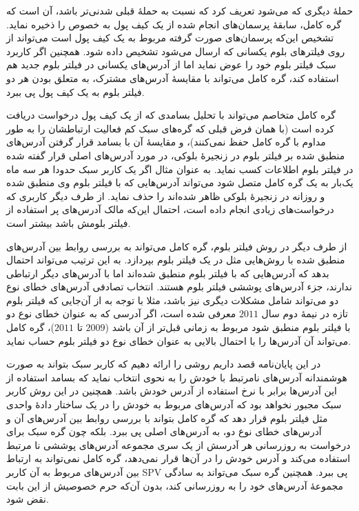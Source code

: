 حملهٔ دیگری که می‌شود تعریف کرد که نسبت به حملهٔ قبلی شدنی‌تر باشد، آن است که گره کامل، سابقهٔ پرسمان‌های انجام شده از یک کیف پول به خصوص را ذخیره نماید. تشخیص این‌که پرسمان‌های صورت گرفته مربوط به یک کیف پول است می‌تواند از روی فیلتر‌های بلوم یکسانی که ارسال می‌شود تشخیص داده شود. همچنین اگر کاربرد سبک فیلتر بلوم خود را عوض نماید اما از آدرس‌های یکسانی در فیلتر بلوم جدید هم استفاده کند،‌ گره کامل می‌تواند با مقایسهٔ آدرس‌های مشترک، به متعلق بودن هر دو فیلتر بلوم به یک کیف پول پی ببرد.

گره کامل متخاصم می‌تواند با تحلیل بسامدی که از یک کیف پول درخواست دریافت کرده است (با همان فرض قبلی که گره‌های سبک کم فعالیت ارتباطشان را به طور مداوم با گره کامل حفظ نمی‌کنند)، و مقایسهٔ آن با بسامد قرار گرفتن آدرس‌های منطبق شده بر فیلتر بلوم در زنجیرهٔ بلوکی، در مورد آدرس‌های اصلی قرار گفته شده در فیلتر بلوم اطلاعات کسب نماید. به عنوان مثال اگر یک کاربر سبک حدودا هر سه ماه یک‌بار به یک گره کامل متصل شود می‌تواند آدرس‌هایی که با فیلتر بلوم وی منطبق شده و روزانه در زنجیرهٔ بلوکی ظاهر شده‌اند را حذف نماید. از طرف دیگر کاربری که درخواست‌های زیادی انجام داده است، احتمال این‌که مالک آدرس‌های پر استفاده از فیلتر بلومش باشد بیشتر است. 

از طرف دیگر در روش فیلتر بلوم، گره کامل می‌تواند به بررسی روابط بین آدرس‌های منطبق شده با روش‌هایی مثل \cite{Meiklejohn2013} در یک فیلتر بلوم بپردازد. به این ترتیب می‌تواند احتمال بدهد که آدرس‌هایی که با فیلتر بلوم منطبق شده‌اند اما با آدرس‌های دیگر ارتباطی ندارند، جزء آدرس‌های پوششی فیلتر بلوم هستند\cite{Gervais2014}.  انتخاب تصادفی آدرس‌های خطای نوع دو می‌تواند شامل مشکلات دیگری نیز باشد، مثلا با توجه به \cite{Gervais2014} از آن‌جایی که فیلتر بلوم تازه در نیمهٔ دوم سال $2011$ معرفی شده است، اگر آدرسی که به عنوان خطای نوع دو با فیلتر بلوم منطبق شود مربوط به زمانی قبل‌تر از آن باشد ($2009$ تا $2011$)، گره کامل می‌تواند آن آدرس‌ها را با احتمال بالایی به عنوان خطای نوع دو فیلتر بلوم حساب نماید.

در این پایان‌نامه قصد داریم روشی را ارائه دهیم که کاربر سبک بتواند به صورت هوشمندانه آدرس‌های نامرتبط با خودش را به نحوی انتخاب نماید که بسامد استفاده از این آدرس‌ها برابر با نرخ استفاده از آدرس خودش باشد. همچنین در این روش کاربر سبک مجبور نخواهد بود که آدرس‌های مربوط به خودش را در یک ساختار دادهٔ واحدی مثل فیلتر بلوم قرار دهد که گره کامل بتواند با بررسی روابط بین آدرس‌های آن و آدرس‌های خطای نوع دو،‌ به آدرس‌های اصلی پی ببرد. بلکه چون گره سبک برای درخواست به روزرسانی هر آدرسش از یک سری مجموعه آدرس‌های پوششی نا مرتبط استفاده می‌کند و آدرس خودش را در آن‌ها قرار نمی‌دهد، گره کامل نمی‌تواند به ارتباط بین آدرس‌های مربوط به آن کاربر SPV پی ببرد. همچنین گره سبک می‌تواند به سادگی مجموعهٔ آدرس‌های خود را به روزرسانی کند، بدون آن‌که حرم خصوصیش از این بابت نقض شود. 



